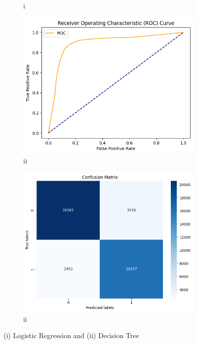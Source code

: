\documentclass{josis}
\begin{document}
\begin{figure}[!h]
\begin{subfigure}{.24\textwidth}
    \caption{i}
    \label{SUBFIGURE LABEL 2}
\end{subfigure}
\begin{subfigure}{.24\textwidth}
    \centering
    \includegraphics[width=0.95\linewidth]{ROC2.png}  
    \caption{ii}
    \label{SUBFIGURE LABEL 3}
\end{subfigure}
\begin{subfigure}{.24\textwidth}
    \centering
    \includegraphics[width=0.95\linewidth]{CM2.png}  
    \caption{ii}
    \label{SUBFIGURE LABEL 4}
\end{subfigure}
\caption{(i) Logistic Regression and (ii) Decision Tree}
\label{FIGURE LABEL1}
\end{figure}
\end{document}
